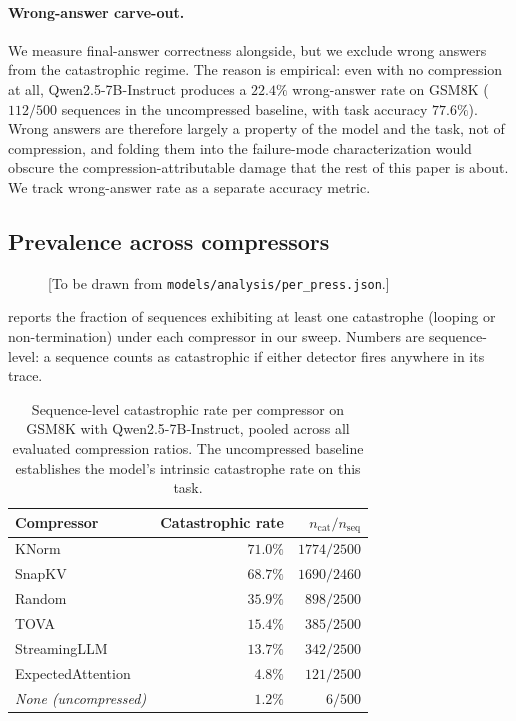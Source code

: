 \documentclass[11pt,a4paper]{article}
\begin{document}
\paragraph{Wrong-answer carve-out.} We measure final-answer correctness alongside, but we exclude wrong answers from the catastrophic regime. The reason is empirical: even with no compression at all, Qwen2.5-7B-Instruct produces a $22.4\%$ wrong-answer rate on GSM8K ($112 / 500$ sequences in the uncompressed baseline, with task accuracy $77.6\%$). Wrong answers are therefore largely a property of the model and the task, not of compression, and folding them into the failure-mode characterization would obscure the compression-attributable damage that the rest of this paper is about. We track wrong-answer rate as a separate accuracy metric.

\subsection{Prevalence across compressors}
\label{sec:failures:per-press}

\begin{figure}[H]
  \centering
  \caption{[To be drawn from \texttt{models/analysis/per\_press.json}.]}
  \label{fig:per-press}
\end{figure}

 reports the fraction of sequences exhibiting at least one catastrophe (looping or non-termination) under each compressor in our sweep. Numbers are sequence-level: a sequence counts as catastrophic if either detector fires anywhere in its trace.

\begin{table}[H]
\centering
\small
\begin{tabular}{lrr}
\toprule
\textbf{Compressor} & \textbf{Catastrophic rate} & $n_{\text{cat}} / n_{\text{seq}}$ \\
\midrule
KNorm              & $71.0\%$ & $1774 / 2500$ \\
SnapKV             & $68.7\%$ & $1690 / 2460$ \\
Random             & $35.9\%$ & $898 / 2500$ \\
TOVA               & $15.4\%$ & $385 / 2500$ \\
StreamingLLM       & $13.7\%$ & $342 / 2500$ \\
ExpectedAttention  & $4.8\%$  & $121 / 2500$ \\
\midrule
\textit{None (uncompressed)} & \textit{$1.2\%$} & \textit{$6 / 500$} \\
\bottomrule
\end{tabular}
\caption{Sequence-level catastrophic rate per compressor on GSM8K with Qwen2.5-7B-Instruct, pooled across all evaluated compression ratios. The uncompressed baseline establishes the model's intrinsic catastrophe rate on this task.}
\label{tab:per-press}
\end{table}
\end{document}
